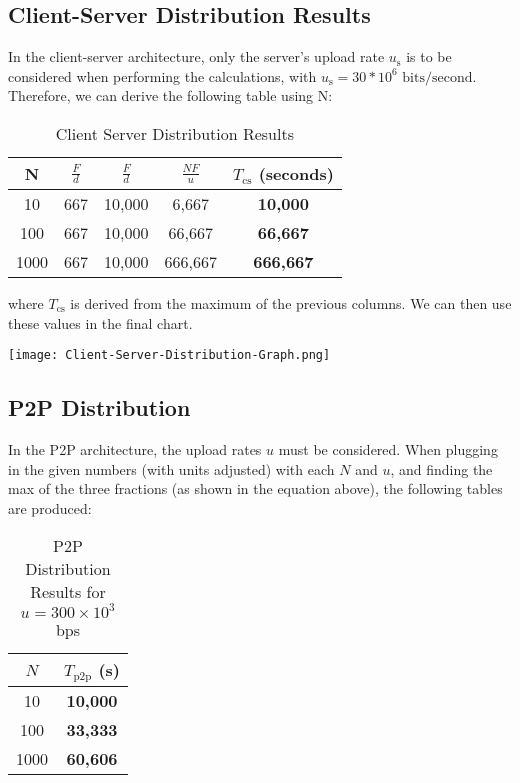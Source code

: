 \documentclass{article}
\begin{document}
\subsection{Client-Server Distribution Results}
In the client-server architecture, only the server's upload rate $u_{\text{s}}$ is to be considered when performing the calculations, with $u_{\text{s}} = 30 * 10^6 \text{ bits/second}$. Therefore, we can derive the following table using N:

\begin{table}[htbp]
  \centering
  \begin{tabular}{|c|c|c|c|c|}
    \hline
    N & $\frac{F}{d}$ & $\frac{F}{d}$ & $\frac{NF}{u}$ & $T_{\text{cs}}$ (seconds) \\ \hline
    10 & 667 & 10,000 & 6,667 & \textbf{10,000} \\ \hline
    100 & 667 & 10,000 & 66,667 & \textbf{66,667} \\ \hline
    1000 & 667 & 10,000 & 666,667 & \textbf{666,667} \\ \hline
  \end{tabular}
  \caption{Client Server Distribution Results}
\end{table}

where $T_{\text{cs}}$ is derived from the maximum of the previous columns. We can then use these values in the final chart.

\begin{center}
  \texttt{[image: Client-Server-Distribution-Graph.png]}
\end{center}

\subsection{P2P Distribution}
In the P2P architecture, the upload rates $u$ must be considered. When plugging in the given numbers (with units adjusted) with each $N$ and $u$, and finding the max of the three fractions (as shown in the equation above), the following tables are produced:

\begin{table}[H]
  \centering
  \setlength{\tabcolsep}{8pt} %
  \begin{tabular}{|c|c|}
    \hline
    \(N\) & \(T_{\text{p2p}}\) (s) \\ \hline
    10    & \textbf{10,000}      \\ \hline
    100   & \textbf{33,333}      \\ \hline
    1000  & \textbf{60,606}      \\ \hline
  \end{tabular}
  \caption{P2P Distribution Results for \(u = 300 \times 10^3\) bps}
  \label{tab:p2p_300bps}
\end{table}
\end{document}
